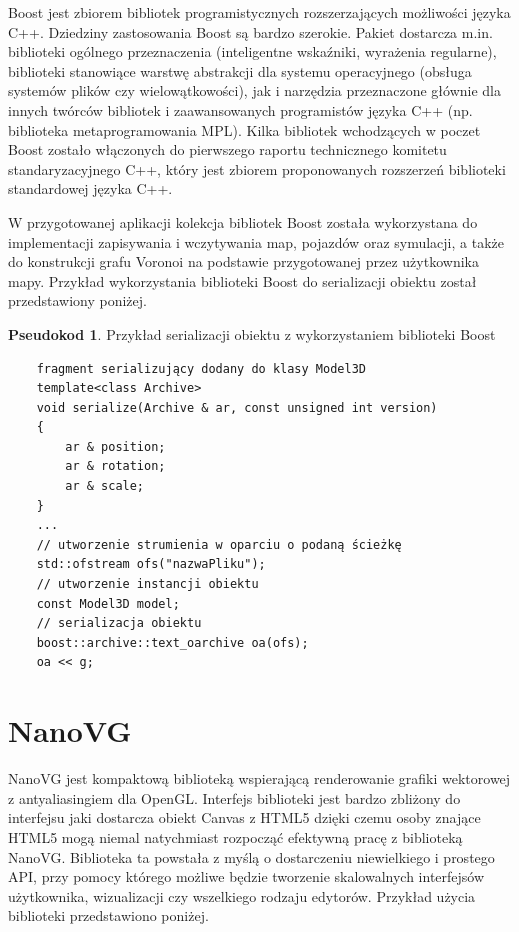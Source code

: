 \documentclass[a4paper,11pt,twoside]{report}
\theoremstyle{definition}
\newtheorem{pseudokod}{Pseudokod}[subsection]
\begin{document}
Boost jest zbiorem bibliotek programistycznych rozszerzających możliwości języka C++. Dziedziny zastosowania Boost są bardzo szerokie. Pakiet dostarcza m.in. biblioteki ogólnego przeznaczenia (inteligentne wskaźniki, wyrażenia regularne), biblioteki stanowiące warstwę abstrakcji dla systemu operacyjnego (obsługa systemów plików czy wielowątkowości), jak i narzędzia przeznaczone głównie dla innych twórców bibliotek i zaawansowanych programistów języka C++ (np. biblioteka metaprogramowania MPL). Kilka bibliotek wchodzących w poczet Boost zostało włączonych do pierwszego raportu technicznego komitetu standaryzacyjnego C++, który jest zbiorem proponowanych rozszerzeń biblioteki standardowej języka C++. 

W przygotowanej aplikacji kolekcja bibliotek Boost została wykorzystana do implementacji zapisywania i wczytywania map, pojazdów oraz symulacji, a także do konstrukcji grafu Voronoi na podstawie przygotowanej przez użytkownika mapy.  Przykład wykorzystania biblioteki Boost do serializacji obiektu został przedstawiony poniżej.

\begin{pseudokod}
Przykład serializacji obiektu z wykorzystaniem biblioteki Boost
\begin{verbatim}
    fragment serializujący dodany do klasy Model3D
    template<class Archive>
    void serialize(Archive & ar, const unsigned int version)
    {
        ar & position;
        ar & rotation;
        ar & scale;
    }
    ...
    // utworzenie strumienia w oparciu o podaną ścieżkę
    std::ofstream ofs("nazwaPliku");
    // utworzenie instancji obiektu
    const Model3D model;
    // serializacja obiektu 
    boost::archive::text_oarchive oa(ofs);
    oa << g;
\end{verbatim}
\end{pseudokod}

\section{NanoVG}

NanoVG jest kompaktową biblioteką wspierającą renderowanie grafiki wektorowej z antyaliasingiem dla OpenGL. Interfejs biblioteki jest bardzo zbliżony do interfejsu jaki dostarcza obiekt Canvas z HTML5 dzięki czemu osoby znające HTML5 mogą niemal natychmiast rozpocząć efektywną pracę z biblioteką NanoVG. Biblioteka ta powstała z myślą o dostarczeniu niewielkiego i prostego API, przy pomocy którego możliwe będzie tworzenie skalowalnych interfejsów użytkownika, wizualizacji czy wszelkiego rodzaju edytorów. Przykład użycia biblioteki przedstawiono poniżej.
\end{document}
